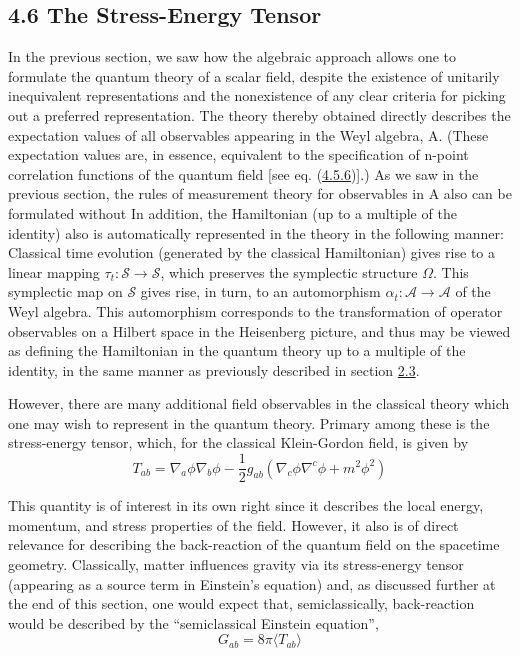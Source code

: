 \documentclass[11pt,a4paper]{article}
\begin{document}
\subsection*{4.6 The Stress-Energy Tensor}\hypertarget{sec:4.6}{}

In the previous section, we saw how the algebraic approach allows one to formulate the quantum theory of a scalar field, despite the existence of unitarily inequivalent representations and the nonexistence of any clear criteria for picking out a preferred representation. The theory thereby obtained directly describes the expectation values of all observables appearing in the Weyl algebra, A. (These expectation values are, in essence, equivalent to the specification of n-point correlation functions of the quantum field {[}see eq. (\hyperref[eq:4.5.6]{4.5.6}){]}.) As we saw in the previous section, the rules of measurement theory for observables in A also can be formulated without In addition, the Hamiltonian (up to a multiple of the identity) also is automatically represented in the theory in the following manner: Classical time evolution (generated by the classical Hamiltonian) gives rise to a linear mapping \(\tau_t:\mathcal S\to\mathcal S\), which preserves the symplectic structure \(\Omega\). This symplectic map on \(\mathcal S\) gives rise, in turn, to an automorphism \(\alpha_t: \mathcal{A} \to \mathcal{A}\) of the Weyl algebra. This automorphism corresponds to the transformation of operator observables on a Hilbert space in the Heisenberg picture, and thus may be viewed as defining the Hamiltonian in the quantum theory up to a multiple of the identity, in the same manner as previously described in section \hyperlink{sec:2.3}{2.3}.

However, there are many additional field observables in the classical theory which one may wish to represent in the quantum theory. Primary among these is the stress-energy tensor, which, for the classical Klein-Gordon field, is given by
\begin{equation*}
T_{ab} = \nabla_a \phi \nabla_b \phi - \frac{1}{2} g_{ab} (\nabla_c \phi \nabla^c \phi + m^2 \phi^2) \tag{4.6.1}\label{eq:4.6.1}
\end{equation*}

This quantity is of interest in its own right since it describes the \hypertarget{source-99}{} local energy, momentum, and stress properties of the field. However, it also is of direct relevance for describing the back-reaction of the quantum field on the spacetime geometry. Classically, matter influences gravity via its stress-energy tensor (appearing as a source term in Einstein's equation) and, as discussed further at the end of this section, one would expect that, semiclassically, back-reaction would be described by the ``semiclassical Einstein equation'',
\begin{equation*}
G_{ab} = 8\pi \langle T_{ab}\rangle \tag{4.6.2}\label{eq:4.6.2}
\end{equation*}
\end{document}
